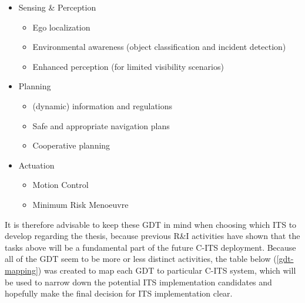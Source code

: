 \documentclass[main.tex]{subfiles}
\begin{document}
\begin{itemize}
    \item Sensing \& Perception
    \begin{itemize}
        \item Ego localization
        \item Environmental awareness (object classification and incident detection)
        \item Enhanced perception (for limited visibility scenarios)
    \end{itemize}
    \item Planning
    \begin{itemize}
        \item (dynamic) information and regulations
        \item Safe and appropriate navigation plans
        \item Cooperative planning
    \end{itemize}
    \item Actuation
    \begin{itemize}
        \item Motion Control
        \item Minimum Risk Menoeuvre
    \end{itemize}
\end{itemize}

It is therefore advisable to keep these GDT in mind when choosing which ITS to develop 
regarding the thesis, because previous R\&I activities have shown that the tasks above will be a fundamental part 
of the future C-ITS deployment. Because all of the GDT seem to be more or less distinct
activities, the table below (\ref{gdt-mapping}) was created to map each GDT to particular C-ITS system, which
will be used to narrow down the potential ITS implementation candidates and hopefully make the final
decision for ITS implementation clear. 
\end{document}
